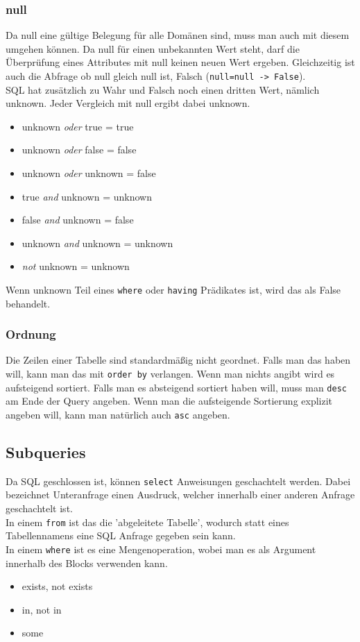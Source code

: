 \documentclass{article}
\begin{document}
 	\subsubsection{null}
 	Da null eine gültige Belegung für alle Domänen sind, muss man auch mit diesem umgehen können. Da null für einen unbekannten Wert steht, darf die Überprüfung eines Attributes mit null keinen neuen Wert ergeben. Gleichzeitig ist auch die Abfrage ob null gleich null ist, Falsch (\verb|null=null -> False|). \\
 	SQL hat zusätzlich zu Wahr und Falsch noch einen dritten Wert, nämlich unknown. Jeder Vergleich mit null ergibt dabei unknown.
 	\begin{itemize}
 		\item{unknown \textit{oder} true = true}
 		\item{unknown \textit{oder} false = false}
 		\item{unknown \textit{oder} unknown = false}
 	\end{itemize}
 	\begin{itemize}
 		\item{true \textit{and} unknown = unknown}
 		\item{false \textit{and} unknown = false}
 		\item{unknown \textit{and} unknown = unknown}
 	\end{itemize}
 	\begin{itemize}
 		\item{\textit{not} unknown = unknown}
 	\end{itemize}
 	Wenn unknown Teil eines \verb|where| oder \verb|having| Prädikates ist, wird das als False behandelt. \\
 	\subsubsection{Ordnung}
 	Die Zeilen einer Tabelle sind standardmäßig nicht geordnet. Falls man das haben will, kann man das mit \verb|order by| verlangen. Wenn man nichts angibt wird es aufsteigend sortiert. Falls man es absteigend sortiert haben will, muss man \verb|desc| am Ende der Query angeben. Wenn man die aufsteigende Sortierung explizit angeben will, kann man natürlich auch \verb|asc| angeben.
	\subsection{Subqueries}
	Da SQL geschlossen ist, können \verb|select| Anweisungen geschachtelt werden. Dabei bezeichnet Unteranfrage einen Ausdruck, welcher innerhalb einer anderen Anfrage geschachtelt ist. \\
	In einem \verb|from| ist das die 'abgeleitete Tabelle', wodurch statt eines Tabellennamens eine SQL Anfrage gegeben sein kann. \\
	In einem \verb|where| ist es eine Mengenoperation, wobei man es als Argument innerhalb des Blocks verwenden kann. \\
	\begin{itemize}
		\item{exists, not exists}
		\item{in, not in}
		\item{some}
	\end{itemize}
\end{document}
